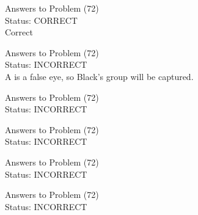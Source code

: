 \documentclass[11pt]{article}
\begin{document}
\begin{minipage}[t]{0.5\textwidth}
  {\centering
  
  Answers to Problem (72)\\
  Status: CORRECT\\
  Correct\\
  }
\end{minipage}
\begin{minipage}[t]{0.5\textwidth}
  {\centering
  
  Answers to Problem (72)\\
  Status: INCORRECT\\
  A is a false eye, so Black's group will be captured.\\
  }
\end{minipage}
\begin{minipage}[t]{0.5\textwidth}
  {\centering
  
  Answers to Problem (72)\\
  Status: INCORRECT\\
  
  }
\end{minipage}
\begin{minipage}[t]{0.5\textwidth}
  {\centering
  
  Answers to Problem (72)\\
  Status: INCORRECT\\
  
  }
\end{minipage}
\begin{minipage}[t]{0.5\textwidth}
  {\centering
  
  Answers to Problem (72)\\
  Status: INCORRECT\\
  
  }
\end{minipage}
\begin{minipage}[t]{0.5\textwidth}
  {\centering
  
  Answers to Problem (72)\\
  Status: INCORRECT\\
  
  }
\end{minipage}
\end{document}
